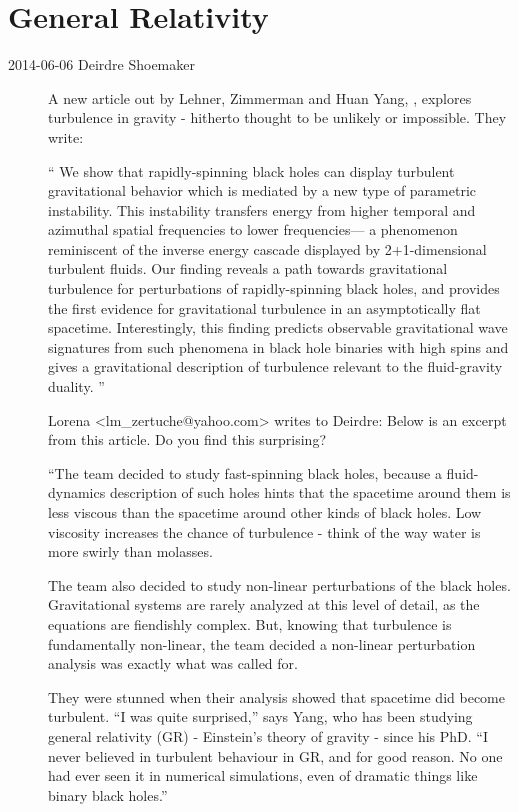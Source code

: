\section{General Relativity}
\label{sect:GR}

\begin{description}
\item[2014-06-06 Deirdre Shoemaker]
A new article out by
{Lehner},
 {Zimmerman}
and Huan Yang,
,
explores turbulence in gravity - hitherto thought to be unlikely or
impossible. They write:

``
We show that rapidly-spinning black holes can display turbulent
gravitational behavior which is mediated by a new type of parametric
instability. This instability transfers energy from higher temporal and
azimuthal spatial frequencies to lower frequencies--- a phenomenon
reminiscent of the inverse energy cascade displayed by 2+1-dimensional
turbulent fluids. Our finding reveals a path towards gravitational
turbulence for perturbations of rapidly-spinning black holes, and
provides the first evidence for gravitational turbulence in an
asymptotically flat spacetime. Interestingly, this finding predicts
observable gravitational wave signatures from such phenomena in black
hole binaries with high spins and gives a gravitational description of
turbulence relevant to the fluid-gravity duality.
''


Lorena <lm\_zertuche@yahoo.com> writes to Deirdre:
Below is an excerpt from
{this article}. Do you find this surprising?

``The team decided to study fast-spinning black holes, because a
fluid-dynamics description of such holes hints that the spacetime around
them is less viscous than the spacetime around other kinds of black
holes. Low viscosity increases the chance of turbulence - think of the
way water is more swirly than molasses.

The team also decided to study non-linear perturbations of the black
holes. Gravitational systems are rarely analyzed at this level of detail,
as the equations are fiendishly complex. But, knowing that turbulence is
fundamentally non-linear, the team decided a non-linear perturbation
analysis was exactly what was called for.

They were stunned when their analysis showed that spacetime did become
turbulent.
``I was quite surprised,'' says Yang, who has been studying general
relativity (GR) - Einstein's theory of gravity - since his PhD. ``I never
believed in turbulent behaviour in GR, and for good reason. No one had
ever seen it in numerical simulations, even of dramatic things like
binary black holes.''


\end{description}
